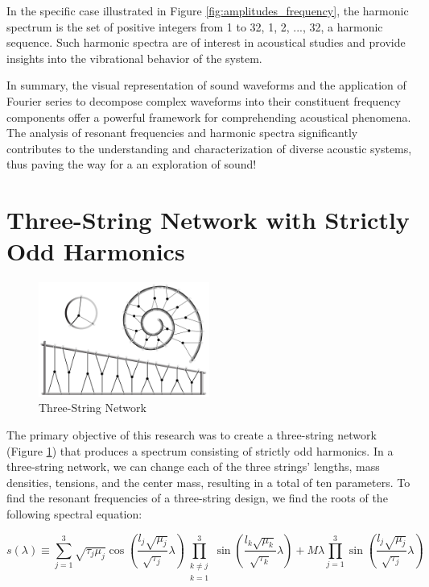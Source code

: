 \documentclass[12pt]{article}
\begin{document}
In the specific case illustrated in Figure \ref{fig:amplitudes_frequency}, the harmonic spectrum is the set of positive integers from 1 to 32, {1, 2, ..., 32}, a harmonic sequence. Such harmonic spectra are of interest in acoustical studies and provide insights into the vibrational behavior of the system.

In summary, the visual representation of sound waveforms and the application of Fourier series to decompose complex waveforms into their constituent frequency components offer a powerful framework for comprehending acoustical phenomena. The analysis of resonant frequencies and harmonic spectra significantly contributes to the understanding and characterization of diverse acoustic systems, thus paving the way for a an exploration of sound!
\section{Three-String Network with Strictly Odd Harmonics}

\begin{figure}[htbp]
    \centering
    \includegraphics[width=0.5\textwidth]{HoopArtistsConception.pdf}
    \caption{Three-String Network}
    \label{fig:three_string_network}
\end{figure}

The primary objective of this research was to create a three-string network (Figure \ref{fig:three_string_network}) that produces a spectrum consisting of strictly odd harmonics. In a three-string network, we can change each of the three strings' lengths, mass densities, tensions, and the center mass, resulting in a total of ten parameters. To find the resonant frequencies of a three-string design, we find the roots of the following spectral equation:

\[s(\lambda) \equiv \sum_{j=1}^3\sqrt{\tau_j\mu_j} \cos\left(\frac{l_j\sqrt{\mu_j}}{\sqrt{\tau_j}}\lambda\right)\prod_{\substack{k\neq j \\ k=1}}^3 \sin\left(\frac{l_k\sqrt{\mu_k}}{\sqrt{\tau_k}}\lambda\right) + M\lambda \prod_{j=1}^3\sin\left(\frac{l_j\sqrt{\mu_j}}{\sqrt{\tau_j}}\lambda\right)\]
\end{document}
